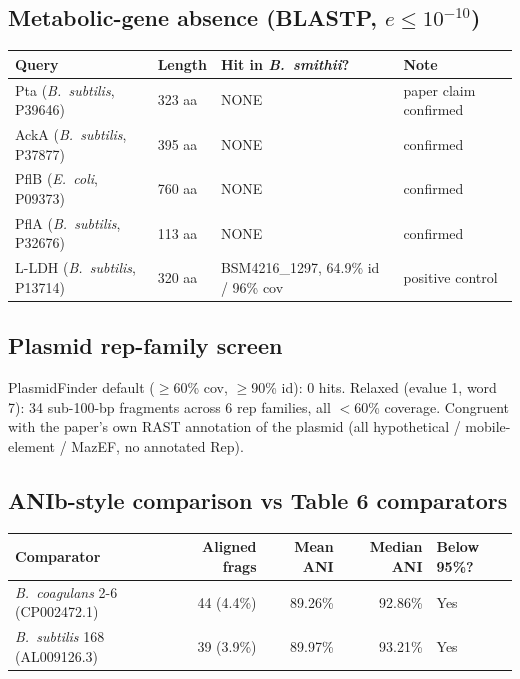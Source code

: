 \documentclass[11pt]{article}
\begin{document}
\subsection{Metabolic-gene absence (BLASTP, $e \leq 10^{-10}$)}
\begin{center}
\begin{tabular}{llll}
\toprule
Query & Length & Hit in \textit{B.\ smithii}? & Note \\
\midrule
Pta (\textit{B.\ subtilis}, P39646) & 323 aa & NONE & paper claim confirmed \\
AckA (\textit{B.\ subtilis}, P37877) & 395 aa & NONE & confirmed \\
PflB (\textit{E.\ coli}, P09373) & 760 aa & NONE & confirmed \\
PflA (\textit{B.\ subtilis}, P32676) & 113 aa & NONE & confirmed \\
L-LDH (\textit{B.\ subtilis}, P13714) & 320 aa & BSM4216\_1297, 64.9\% id / 96\% cov & positive control \\
\bottomrule
\end{tabular}
\end{center}

\subsection{Plasmid rep-family screen}
PlasmidFinder default ($\geq$60\% cov, $\geq$90\% id): 0 hits. Relaxed (evalue 1, word 7): 34 sub-100-bp fragments across 6 rep families, all $<$60\% coverage. Congruent with the paper's own RAST annotation of the plasmid (all hypothetical / mobile-element / MazEF, no annotated Rep).

\subsection{ANIb-style comparison vs Table 6 comparators}
\begin{center}
\begin{tabular}{lrrrl}
\toprule
Comparator & Aligned frags & Mean ANI & Median ANI & Below 95\%? \\
\midrule
\textit{B.\ coagulans} 2-6 (CP002472.1) & 44 (4.4\%) & 89.26\% & 92.86\% & Yes \\
\textit{B.\ subtilis} 168 (AL009126.3)  & 39 (3.9\%) & 89.97\% & 93.21\% & Yes \\
\bottomrule
\end{tabular}
\end{center}
\end{document}
